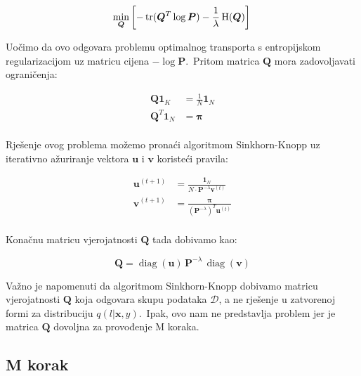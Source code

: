 \documentclass[diplomskirad]{fer}
\begin{document}
\begin{equation}
    \min_{\bm{Q}} \left[-\operatorname{tr}(\bm{Q}^T \log \bm{P}) - \frac{1}{\lambda} \operatorname{H}(\bm{Q}) \right] \\ 
  \label{eq:vibe_e_reversed}
\end{equation}

Uočimo da ovo odgovara problemu optimalnog transporta s entropijskom regularizacijom uz matricu cijena $-\log \bm{P}$.\ Pritom matrica $\bm{Q}$ mora zadovoljavati ograničenja:

\begin{equation}
  \begin{aligned}
    \bm{Q} \bm{1}_K &= \frac{1}{N} \bm{1}_N \\
    \bm{Q}^T \bm{1}_N &= \bm{\pi} \\
  \end{aligned}
\label{eq:vibe_q_matrix_restrictions}
\end{equation}

\pagebreak

Rješenje ovog problema možemo pronaći algoritmom Sinkhorn-Knopp uz iterativno ažuriranje vektora $\bm{u}$ i $\bm{v}$ koristeći pravila:

\begin{equation}
  \begin{aligned}
    \bm{u}^{(t + 1)} &= \frac{\bm{1}_N}{N \cdot \bm{P}^{-\lambda} \bm{v}^{(t)}} \\
    \bm{v}^{(t + 1)} &= \frac{\bm{\pi}}{(\bm{P}^{-\lambda})^T \bm{u}^{(t)}} \\
  \end{aligned}
  \label{eq:vibe_sk_rules}
\end{equation}

Konačnu matricu vjerojatnosti $\bm{Q}$ tada dobivamo kao:

\begin{equation}
  \bm{Q} = \operatorname{diag}(\bm{u})\,\bm{P}^{-\lambda}\,\operatorname{diag}(\bm{v})
  \label{eq:vibe_q_formula}
\end{equation}

Važno je napomenuti da algoritmom Sinkhorn-Knopp dobivamo matricu vjerojatnosti $\bm{Q}$ koja odgovara skupu podataka $\mathcal{D}$, a ne rješenje u zatvorenoj formi za distribuciju $q(l | \bm{x}, y)$.\ 
Ipak, ovo nam ne predstavlja problem jer je matrica $\bm{Q}$ dovoljna za provođenje M koraka.\

\subsection{M korak}
\label{sub:m_step}
\end{document}
